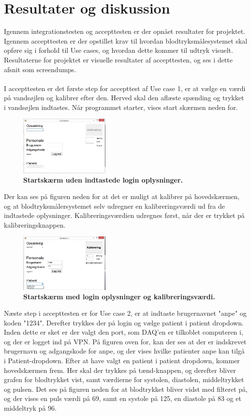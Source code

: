 \section{Resultater og diskussion}
Igennem integrationstesten og accepttesten er der opnået resultater for projektet. Igennem accepttesten er der opstillet krav til hvordan blodtryksmålesystemet skal opføre sig i forhold til Use cases, og hvordan dette kommer til udtryk visuelt. Resultaterne for projektet er visuelle resultater af accepttesten, og ses i dette afsnit som screendumps. \\\\
I accepttesten er det første step for accepttest af Use case 1, er at vælge en værdi på vandsøjlen og kalibrer efter den. Herved skal den aflæste spænding og trykket i vandsøjlen indtastes. Når programmet starter, vises start skærmen neden for.
\begin{figure}[H]
\includegraphics[width =0.4\textwidth , center]{billeder/ITstartGUI}
\caption{\textbf{Startskærm uden indtastede login oplysninger.}}
\end{figure}
Der kan ses på figuren neden for at det er muligt at kalibrer på hovedskærmen, og at blodtryksmålersystemet selv udregner en kalibreringsværdi ud fra de indtastede oplysninger. Kalibreringsværdien udregnes først, når der er trykket på kalibreringsknappen. 
\begin{figure}[H]
\includegraphics[width =0.4\textwidth , center]{billeder/ITstartGUIlogKali}
\caption{\textbf{Startskærm med login oplysninger og kalibreringsværdi.}}
\end{figure}
Næste step i accepttesten er for Use case 2, er at indtaste brugernavnet "anpe" og koden "1234". Derefter trykkes der på login og vælge patient i patient dropdown. Inden dette er sket er der valgt den port, som DAQ’en er tilkoblet computeren i, og der er logget ind på VPN. På figuren oven for, kan der ses at der er indskrevet brugernavn og adgangskode for anpe, og der vises hvilke patienter anpe kan tilgå i Patient-dropdown. Efter at have valgt en patient i patient dropdown, kommer hovedskærmen frem. Her skal der trykkes på tænd-knappen, og derefter bliver grafen for blodtrykket vist, samt værdierne for systolen, diastolen, middeltrykket og pulsen. Det ses på figuren neden for at blodtrykket bliver vidst med filteret på, og der vises en puls værdi på 69, samt en systole på 125, en diastole på 83 og et middeltryk på 96.
